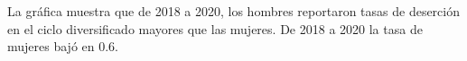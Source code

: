 La gráfica muestra que de 2018 a 2020, los hombres reportaron tasas de deserción en el ciclo diversificado mayores que las mujeres. De 2018 a 2020 la tasa de mujeres bajó en 0.6. 